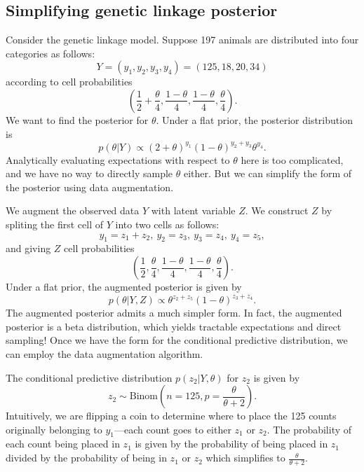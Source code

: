\documentclass{article}
\begin{document}
\subsection{Simplifying genetic linkage posterior}
Consider the genetic linkage model. 
Suppose 197 animals are distributed into four categories as follows: $$Y = (y_{1}, y_{2}, y_{3}, y_{4}) = (125, 18, 20, 34)$$ 
according to cell probabilities 
$$\left(\frac{1}{2} + \frac{\theta}{4}, \frac{1 - \theta}{4}, \frac{1 - \theta}{4}, \frac{\theta}{4}\right).$$ 
We want to find the posterior for $\theta.$ 
Under a flat prior, the posterior distribution is 
$$p(\theta | Y) \propto (2 + \theta)^{y_{1}}(1 - \theta)^{y_{2} + y_{3}}\theta^{y_4}.$$ 
Analytically evaluating expectations with respect to $\theta$ here is too complicated, 
and we have no way to directly sample $\theta$ either. 
But we can simplify the form of the posterior using data augmentation. 

We augment the observed data $Y$ with latent variable $Z$. 
We construct $Z$ by spliting the first cell of $Y$ into two cells as follows:
$$y_{1} = z_{1} + z_{2},  \ y_{2} = z_{3}, \ y_{3} = z_{4}, \ y_{4} = z_{5},$$ 
and giving $Z$ cell probabilities 
$$\left(\frac{1}{2}, \frac{\theta}{4}, \frac{1 - \theta}{4}, \frac{1 - \theta}{4}, \frac{\theta}{4}\right).$$ 
Under a flat prior, the augmented posterior is given by $$p(\theta | Y, Z) \propto \theta^{z_{2} + z_{5}}(1 - \theta)^{z_{3} + z_{4}}.$$ 
The augmented posterior admits a much simpler form. In fact, the augmented posterior is a beta distribution, 
which yields tractable expectations and direct sampling! 
Once we have the form for the conditional predictive distribution, we can employ the data augmentation algorithm. 

The conditional predictive distribution $p(z_2 | Y, \theta)$ for $z_{2}$ is given by 
$$z_{2} \sim \text{Binom}\left(n = 125, p = \frac{\theta}{\theta + 2}\right).$$ 
Intuitively, we are flipping a coin to determine where to place the 125 counts originally 
belonging to $y_1$---each count goes to either $z_1$ or $z_2.$
The probability of each count being placed in $z_1$ is given by the 
probability of being placed in $z_1$ divided by the probability of being in $z_1$ or $z_2$ 
which simplifies to $\frac{\theta}{\theta + 2}$. 
\end{document}
